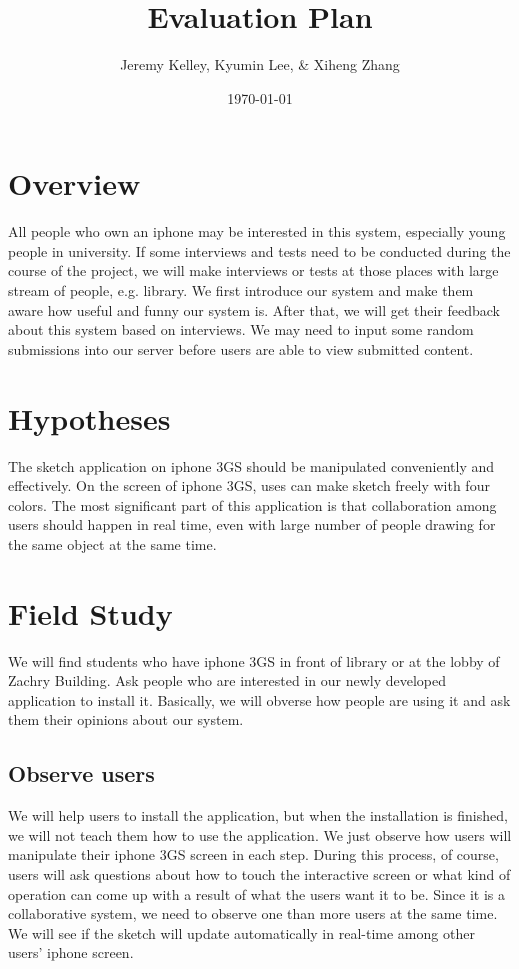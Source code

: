 \documentclass{article}
\begin{document}
\setlength{\parindent}{0pt}
\setlength{\parskip}{.5ex plus 0.5ex minus 0.2ex}




\title{ Evaluation Plan }

\author{ Jeremy Kelley, Kyumin Lee, \& Xiheng Zhang }

\date{\today}

\maketitle

\section{Overview}

All people who own an iphone may be interested in this system, especially young people in university. If some interviews and tests need to be conducted during the course of the project, we will make interviews or tests at those places with large stream of people, e.g. library. We first introduce our system and make them aware how useful and funny our system is.  After that, we will get their feedback about this system based on interviews. We may need to input some random submissions into our server before users are able to view submitted content.

\section{Hypotheses}
The sketch application on iphone 3GS should be manipulated conveniently and effectively. On the screen of iphone 3GS, uses can make sketch freely with four colors. The most significant part of this application is that collaboration among  users should happen in real time, even with large number of people drawing for the same object at the same time.

\section{Field Study}
We will find students who have iphone 3GS in front of library or at the lobby of Zachry Building. Ask people who are interested in our newly developed application to install it. Basically, we will obverse how people are using it and ask them their opinions about our system.

\subsection{Observe users}
We will help users to install the application, but when the installation is finished, we will not teach them how to use the application. We just observe how users will manipulate their iphone 3GS screen in each step. During this process, of course, users will ask questions about how to touch the interactive screen or what kind of operation can come up with a result of what the users want it to be. Since it is a collaborative system, we need to observe one than more users at the same time. We will see if the sketch will update automatically in real-time among other users' iphone screen.
\end{document}
